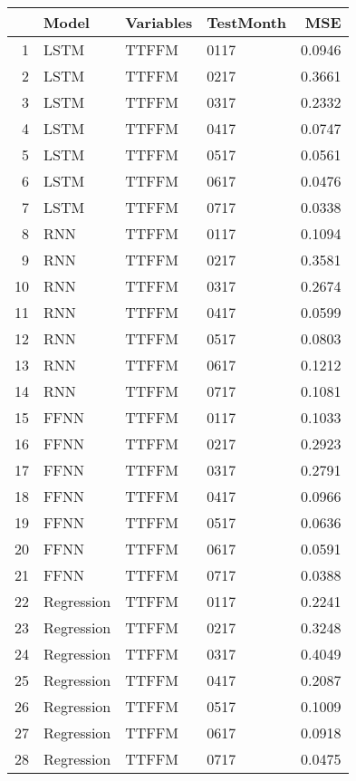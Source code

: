 \begin{table}[ht]
\centering
\begin{tabular}{rlllr}
  \hline
 & Model & Variables & TestMonth & MSE \\ 
  \hline
1 & LSTM & TTFFM  & 0117 & 0.0946 \\ 
  2 & LSTM & TTFFM  & 0217 & 0.3661 \\ 
  3 & LSTM & TTFFM  & 0317 & 0.2332 \\ 
  4 & LSTM & TTFFM  & 0417 & 0.0747 \\ 
  5 & LSTM & TTFFM  & 0517 & 0.0561 \\ 
  6 & LSTM & TTFFM  & 0617 & 0.0476 \\ 
  7 & LSTM & TTFFM  & 0717 & 0.0338 \\ 
  8 & RNN & TTFFM  & 0117 & 0.1094 \\ 
  9 & RNN & TTFFM  & 0217 & 0.3581 \\ 
  10 & RNN & TTFFM  & 0317 & 0.2674 \\ 
  11 & RNN & TTFFM  & 0417 & 0.0599 \\ 
  12 & RNN & TTFFM  & 0517 & 0.0803 \\ 
  13 & RNN & TTFFM  & 0617 & 0.1212 \\ 
  14 & RNN & TTFFM  & 0717 & 0.1081 \\ 
  15 & FFNN & TTFFM  & 0117 & 0.1033 \\ 
  16 & FFNN & TTFFM  & 0217 & 0.2923 \\ 
  17 & FFNN & TTFFM  & 0317 & 0.2791 \\ 
  18 & FFNN & TTFFM  & 0417 & 0.0966 \\ 
  19 & FFNN & TTFFM  & 0517 & 0.0636 \\ 
  20 & FFNN & TTFFM  & 0617 & 0.0591 \\ 
  21 & FFNN & TTFFM  & 0717 & 0.0388 \\ 
  22 & Regression & TTFFM  & 0117 & 0.2241 \\ 
  23 & Regression & TTFFM  & 0217 & 0.3248 \\ 
  24 & Regression & TTFFM  & 0317 & 0.4049 \\ 
  25 & Regression & TTFFM  & 0417 & 0.2087 \\ 
  26 & Regression & TTFFM  & 0517 & 0.1009 \\ 
  27 & Regression & TTFFM  & 0617 & 0.0918 \\ 
  28 & Regression & TTFFM  & 0717 & 0.0475 \\ 

\end{tabular}
\end{table}
